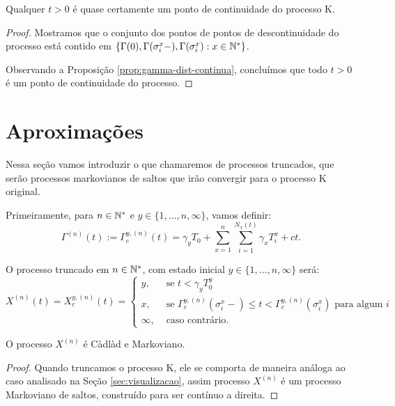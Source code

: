 \begin{corolario}
  \label{cor:continuidades-processo}
  Qualquer $t > 0$ é quase certamente um ponto de continuidade do
  processo K.
\end{corolario}
\begin{proof}
  Mostramos que o conjunto dos pontos de pontos de descontinuidade do
  processo está contido em $\{ \Gamma(0), \Gamma(\sigma_i^x-),
  \Gamma(\sigma_i^x): x \in {\mathbb{N^*}}\}$.

  Observando a Proposição \ref{prop:gamma-dist-continua}, concluímos
  que todo $t > 0$ é um ponto de continuidade do processo.
\end{proof}



\section{Aproximações}
\label{sec:aproximacoes}

Nessa seção vamos introduzir o que chamaremos de processos truncados,
que serão processos markovianos de saltos que irão convergir para o
processo K original.

Primeiramente, para $n \in {\mathbb{N^*}}$ e $y \in \{1, \ldots, n, \infty\}$,
vamos definir:
\begin{equation}
  \Gamma^{(n)} (t) := \Gamma^{y,(n)}_c (t) = \gamma_y T_0
  + \sum_{x =1}^{n} \sum_{i = 1}^{N_x(t)}
  \gamma_x T_i^x
  + ct.
\end{equation}

O processo truncado em $n \in {\mathbb{N^*}}$, com estado inicial $y \in \{1,
\ldots, n, \infty\}$ será:
\begin{equation}
  X^{(n)}(t) = X^{y,(n)}_c(t) = \begin{cases}
    y, & \textrm{ se }  t < \gamma_y T_0^y\\
    x, & \textrm{ se } \Gamma^{y,(n)}_c(\sigma_i^x-) \leq t <
    \Gamma^{y,(n)}_c(\sigma^x_i)
    \text{ para algum } i \\
    \infty, & \textrm{ caso contrário.}
  \end{cases}
\end{equation}

\begin{proposicao}
  O processo $X^{(n)}$ é Càdlàd e Markoviano.
\end{proposicao}
\begin{proof}
  Quando truncamos o processo K, ele se comporta de maneira análoga ao
  caso analisado na Seção \ref{sec:visualizacao}, assim processo
  $X^{(n)}$ é um processo Markoviano de saltos, construído para ser
  contínuo a direita.
\end{proof}

